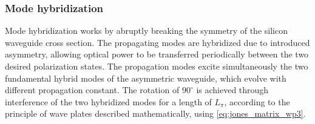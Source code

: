 \documentclass[../report.tex]{subfiles}
\begin{document}
			\subsubsection{Mode hybridization}
Mode hybridization works by abruptly breaking the symmetry of the silicon waveguide cross section. The propagating modes are hybridized due to introduced asymmetry, allowing optical power to be transferred periodically between the two desired polarization states. The propagation modes excite simultaneously the two fundamental hybrid modes of the asymmetric waveguide, which evolve with different propagation constant. The rotation of $90^{\circ}$ is achieved through interference of the two hybridized modes for a length of $L_{\pi}$, according to the principle of wave plates described mathematically, using \ref{eq:jones_matrix_wp3}. 
\end{document}
